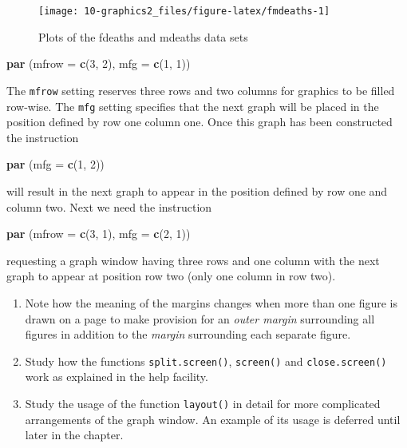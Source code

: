 \documentclass[
]{book}
\newenvironment{Shaded}{\begin{snugshade}}{\end{snugshade}}
\newcommand{\AttributeTok}[1]{\textcolor[rgb]{0.13,0.29,0.53}{#1}}
\newcommand{\DecValTok}[1]{\textcolor[rgb]{0.00,0.00,0.81}{#1}}
\newcommand{\FunctionTok}[1]{\textcolor[rgb]{0.13,0.29,0.53}{\textbf{#1}}}
\newcommand{\NormalTok}[1]{#1}
\begin{document}
\begin{figure}
\texttt{[image: 10-graphics2\_files/figure-latex/fmdeaths-1]} \caption{Plots of the fdeaths and mdeaths data sets}\label{fig:fmdeaths}
\end{figure}

\begin{Shaded}
\begin{Highlighting}[]
\FunctionTok{par}\NormalTok{ (}\AttributeTok{mfrow =} \FunctionTok{c}\NormalTok{(}\DecValTok{3}\NormalTok{, }\DecValTok{2}\NormalTok{), }\AttributeTok{mfg =} \FunctionTok{c}\NormalTok{(}\DecValTok{1}\NormalTok{, }\DecValTok{1}\NormalTok{))}
\end{Highlighting}
\end{Shaded}

The \texttt{mfrow} setting reserves three rows and two columns for graphics to be filled row-wise. The \texttt{mfg} setting specifies that the next graph will be placed in the position defined by row one column one. Once this graph has been constructed the instruction

\begin{Shaded}
\begin{Highlighting}[]
\FunctionTok{par}\NormalTok{ (}\AttributeTok{mfg =} \FunctionTok{c}\NormalTok{(}\DecValTok{1}\NormalTok{, }\DecValTok{2}\NormalTok{))}
\end{Highlighting}
\end{Shaded}

will result in the next graph to appear in the position defined by row one and column two. Next we need the instruction

\begin{Shaded}
\begin{Highlighting}[]
\FunctionTok{par}\NormalTok{ (}\AttributeTok{mfrow =} \FunctionTok{c}\NormalTok{(}\DecValTok{3}\NormalTok{, }\DecValTok{1}\NormalTok{), }\AttributeTok{mfg =} \FunctionTok{c}\NormalTok{(}\DecValTok{2}\NormalTok{, }\DecValTok{1}\NormalTok{))}
\end{Highlighting}
\end{Shaded}

requesting a graph window having three rows and one column with the next graph to appear at position row two (only one column in row two).

\begin{enumerate}
\def\labelenumi{(\alph{enumi})}
\setcounter{enumi}{2}
\item
  Note how the meaning of the margins changes when more than one figure is drawn on a page to make provision for an \emph{{outer margin}} surrounding all figures in addition to the \emph{{margin}} surrounding each separate figure.
\item
  Study how the functions \texttt{split.screen()}, \texttt{screen()} and \texttt{close.screen()} work as explained in the help facility.
\item
  Study the usage of the function \texttt{layout()} in detail for more complicated arrangements of the graph window. An example of its usage is deferred until later in the chapter.
\end{enumerate}
\end{document}
